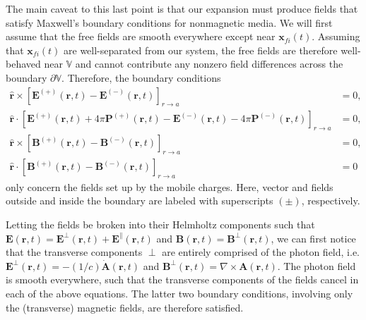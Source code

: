 \documentclass{article}
\begin{document}
The main caveat to this last point is that our expansion must produce fields that satisfy Maxwell's boundary conditions for nonmagnetic media. We will first assume that the free fields are smooth everywhere except near $\mathbf{x}_{fi}(t)$. Assuming that $\mathbf{x}_{fi}(t)$ are well-separated from our system, the free fields are therefore well-behaved near $\mathbb{V}$ and cannot contribute any nonzero field differences across the boundary $\partial\mathbb{V}$. Therefore, the boundary conditions
\begin{equation}
\begin{split}
\hat{\mathbf{r}}\times\left[\mathbf{E}^{(+)}(\mathbf{r},t) - \mathbf{E}^{(-)}(\mathbf{r},t)\right]_{r\to a} &= 0,\\
\hat{\mathbf{r}}\cdot\left[\mathbf{E}^{(+)}(\mathbf{r},t) + 4\pi\mathbf{P}^{(+)}(\mathbf{r},t) - \mathbf{E}^{(-)}(\mathbf{r},t) - 4\pi\mathbf{P}^{(-)}(\mathbf{r},t)\right]_{r\to a} &= 0,\\
\hat{\mathbf{r}}\times\left[\mathbf{B}^{(+)}(\mathbf{r},t) - \mathbf{B}^{(-)}(\mathbf{r},t)\right]_{r\to a} &= 0,\\
\hat{\mathbf{r}}\cdot\left[\mathbf{B}^{(+)}(\mathbf{r},t) - \mathbf{B}^{(-)}(\mathbf{r},t)\right]_{r\to a} &= 0
\end{split}
\end{equation}
only concern the fields set up by the mobile charges. Here, vector and fields outside and inside the boundary are labeled with superscripts $(\pm)$, respectively. 

Letting the fields be broken into their Helmholtz components such that $\mathbf{E}(\mathbf{r},t) = \mathbf{E}^\perp(\mathbf{r},t) + \mathbf{E}^\parallel(\mathbf{r},t)$ and $\mathbf{B}(\mathbf{r},t) = \mathbf{B}^\perp(\mathbf{r},t)$, we can first notice that the transverse components $\perp$ are entirely comprised of the photon field, i.e. $\mathbf{E}^\perp(\mathbf{r},t) = -(1/c)\dot{\mathbf{A}}(\mathbf{r},t)$ and $\mathbf{B}^\perp(\mathbf{r},t) = \nabla\times\mathbf{A}(\mathbf{r},t)$. The photon field is smooth everywhere, such that the transverse components of the fields cancel in each of the above equations. The latter two boundary conditions, involving only the (transverse) magnetic fields, are therefore satisfied.
\end{document}
